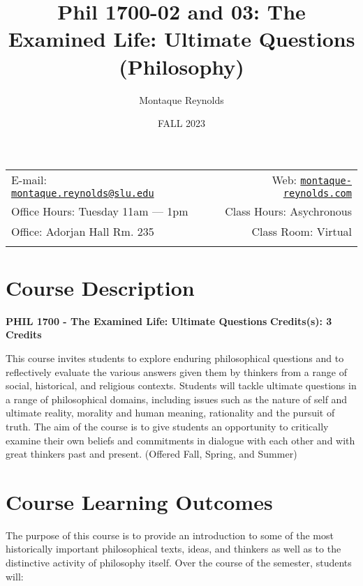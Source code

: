 \documentclass[11pt,]{article}
\title{Phil 1700-02 and 03: The Examined Life: Ultimate Questions
(Philosophy)}
\author{Montaque Reynolds}
\date{FALL 2023}
\begin{document}
		\maketitle
	

		\thispagestyle{firststyle}



	\noindent \begin{tabular*}{\textwidth}{ @{\extracolsep{\fill}} lr @{\extracolsep{\fill}}}


E-mail: \texttt{\href{mailto:montaque.reynolds@slu.edu}{\nolinkurl{montaque.reynolds@slu.edu}}} & Web: \href{http://montaque-reynolds.com}{\tt montaque-reynolds.com}\\
Office Hours: Tuesday 11am --- 1pm  &  Class Hours: Asychronous\\
Office: Adorjan Hall Rm. 235  & Class Room: Virtual\\
	&  \\
	\hline
	\end{tabular*}

\vspace{2mm}



\section{Course Description}\label{course-description}

\textbf{PHIL 1700 - The Examined Life: Ultimate Questions}
\textbf{Credits(s): 3 Credits}

This course invites students to explore enduring philosophical questions
and to reflectively evaluate the various answers given them by thinkers
from a range of social, historical, and religious contexts. Students
will tackle ultimate questions in a range of philosophical domains,
including issues such as the nature of self and ultimate reality,
morality and human meaning, rationality and the pursuit of truth. The
aim of the course is to give students an opportunity to critically
examine their own beliefs and commitments in dialogue with each other
and with great thinkers past and present. (Offered Fall, Spring, and
Summer)

\section{Course Learning Outcomes}\label{course-learning-outcomes}

The purpose of this course is to provide an introduction to some of the
most historically important philosophical texts, ideas, and thinkers as
well as to the distinctive activity of philosophy itself. Over the
course of the semester, students will:
\end{document}
